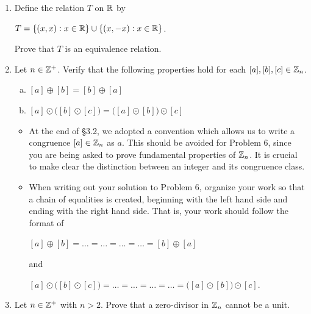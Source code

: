 \documentclass[11pt,fleqn,dvipsnames,usenames]{article}
\begin{document}
\begin{enumerate}
\item Define the relation $T$ on $\mathbb{R}$ by
\begin{center}
$T = \left\{(x,x): x\in\mathbb{R}\right\}\cup \left\{(x,-x): x\in\mathbb{R}\right\}$.
\end{center}
Prove that $T$ is an equivalence relation.

\item Let $n\in\mathbb{Z}^{+}$.  Verify that the following properties hold for each $[a],[b],[c]\in\mathbb{Z}_n$.
\vsmsp

\begin{enumerate}[(a)]
\item $[a] \oplus [b] = [b]\oplus [a]$
\item $[a] \odot \big([b] \odot [c]\big) = \big([a] \odot [b]\big)\odot [c]$
\end{enumerate}

\notes
\begin{itemize}
\item At the end of \S3.2, we adopted a convention which allows us to write a congruence $[a]\in\mathbb{Z}_n$ as $a$.  This should be avoided for Problem 6, since you are being asked to prove fundamental properties of $\mathbb{Z}_n$.  It is crucial to make clear the distinction between an integer and its congruence class.
\item When writing out your solution to Problem 6, organize your work so that a chain of equalities is created, beginning with the left hand side and ending with the right hand side.  That is, your work should follow the format of
\begin{center}
$[a]\oplus [b] = \ldots = \ldots = \ldots = \ldots = [b] \oplus [a]$
\end{center}
and
\begin{center}
$[a] \odot \big([b] \odot [c]\big) = \ldots = \ldots = \ldots = \ldots = \big([a] \odot [b]\big)\odot [c]$.
\end{center}
\end{itemize}
\item Let $n\in\mathbb{Z}^+$ with $n > 2$.  Prove that a zero-divisor in $\mathbb{Z}_n$ cannot be a unit.

\end{enumerate}
\end{document}
